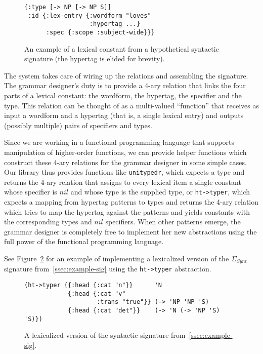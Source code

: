 \begin{figure}
  \centering
\begin{verbatim}
{:type [-> NP [-> NP S]]
 :id {:lex-entry {:wordform "loves"
                  :hypertag ...}
      :spec {:scope :subject-wide}}}
\end{verbatim}
  \caption{\label{fig:lex-const} An example of a lexical constant from a
    hypothetical syntactic signature (the hypertag is elided for brevity).}
\end{figure}

The system takes care of wiring up the relations and assembling the
signature. The grammar designer's duty is to provide a 4-ary relation
that links the four parts of a lexical constant: the wordform, the
hypertag, the specifier and the type. This relation can be thought of as
a multi-valued ``function'' that receives as input a wordform and a
hypertag (that is, a single lexical entry) and outputs (possibly
multiple) pairs of specifiers and types.

Since we are working in a functional programming language that supports
manipulation of higher-order functions, we can provide helper functions
which construct these 4-ary relations for the grammar designer in some
simple cases. Our library thus provides functions like
\texttt{unitypedr}, which expects a type and returns the 4-ary relation
that assigns to every lexical item a single constant whose specifier is
$nil$ and whose type is the supplied type, or \texttt{ht->typer}, which
expects a mapping from hypertag patterns to types and returns the 4-ary
relation which tries to map the hypertag against the patterns and yields
constants with the corresponding types and $nil$ specifiers. When other
patterns emerge, the grammar designer is completely free to implement
her new abstractions using the full power of the functional programming
language.

See Figure~\ref{fig:lex-sig-impl} for an example of implementing a
lexicalized version of the $\Sigma_{Synt}$ signature
from~\ref{ssec:example-sig} using the \texttt{ht->typer} abstraction.

\begin{figure}
  \centering
\begin{verbatim}
(ht->typer {{:head {:cat "n"}}      'N
            {:head {:cat "v"
                    :trans "true"}} (-> 'NP 'NP 'S)
            {:head {:cat "det"}}    (-> 'N (-> 'NP 'S) 'S)})
\end{verbatim}
  \caption{\label{fig:lex-sig-impl} A lexicalized version of the
    syntactic signature from~\ref{ssec:example-sig}.}
\end{figure}

